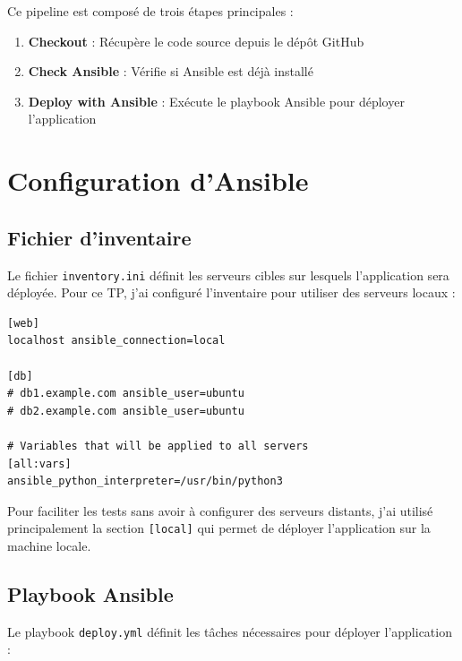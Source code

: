 \documentclass{article}
\begin{document}
Ce pipeline est composé de trois étapes principales :
\begin{enumerate}
    \item \textbf{Checkout} : Récupère le code source depuis le dépôt GitHub
    \item \textbf{Check Ansible} : Vérifie si Ansible est déjà installé
    \item \textbf{Deploy with Ansible} : Exécute le playbook Ansible pour déployer l'application
\end{enumerate}

\section{Configuration d'Ansible}
\subsection{Fichier d'inventaire}

Le fichier \texttt{inventory.ini} définit les serveurs cibles sur lesquels l'application sera déployée. Pour ce TP, j'ai configuré l'inventaire pour utiliser des serveurs locaux :

\begin{lstlisting}
[web]
localhost ansible_connection=local

[db]
# db1.example.com ansible_user=ubuntu
# db2.example.com ansible_user=ubuntu

# Variables that will be applied to all servers
[all:vars]
ansible_python_interpreter=/usr/bin/python3
\end{lstlisting}

Pour faciliter les tests sans avoir à configurer des serveurs distants, j'ai utilisé principalement la section \texttt{[local]} qui permet de déployer l'application sur la machine locale.

\subsection{Playbook Ansible}

Le playbook \texttt{deploy.yml} définit les tâches nécessaires pour déployer l'application :
\end{document}
